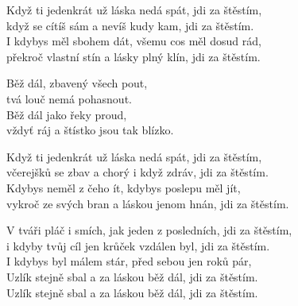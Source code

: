 \ve{} 
Když ti jedenkrát už láska nedá spát, jdi za štěstím,\\
když se cítíš sám a nevíš kudy kam, jdi za štěstím.\\
I kdybys měl sbohem dát, všemu cos měl dosud rád,\\
překroč vlastní stín a lásky plný klín, jdi za štěstím.

\cho{}
Běž dál, zbavený všech pout,\\
tvá louč nemá pohasnout.\\
Běž dál jako řeky proud,\\
vždyť ráj a štístko jsou tak blízko.

\ve{} 
Když ti jedenkrát už láska nedá spát, jdi za štěstím,\\
včerejšků se zbav a chorý i když zdráv, jdi za štěstím.\\
Kdybys neměl z čeho ít, kdybys poslepu měl jít,\\
vykroč ze svých bran a láskou jenom hnán, jdi za štěstím.

\cho{}

\ve{} 
V tváři pláč i smích, jak jeden z posledních, jdi za štěstím,\\
i kdyby tvůj cíl jen krůček vzdálen byl, jdi za štěstím.\\
I kdybys byl málem stár, před sebou jen roků pár,\\
Uzlík stejně sbal a za láskou běž dál, jdi za štěstím.\\
Uzlík stejně sbal a za láskou běž dál, jdi za štěstím.\\
\esong